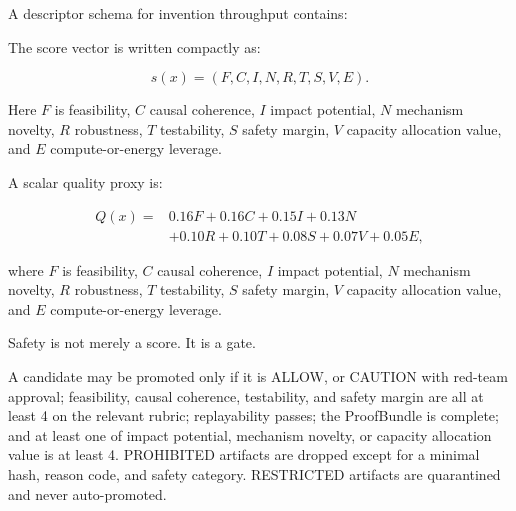 A descriptor schema for invention throughput contains:

\begin{Shaded}
\begin{Highlighting}[]
\end{Highlighting}
\end{Shaded}

The score vector is written compactly as:

\[
s(x)=(F,C,I,N,R,T,S,V,E).
\]

Here \(F\) is feasibility, \(C\) causal coherence, \(I\) impact
potential, \(N\) mechanism novelty, \(R\) robustness, \(T\) testability,
\(S\) safety margin, \(V\) capacity allocation value, and \(E\)
compute-or-energy leverage.

A scalar quality proxy is:

\[
\begin{aligned}
Q(x)=&
0.16F + 0.16C + 0.15I + 0.13N\\
&+0.10R + 0.10T + 0.08S + 0.07V + 0.05E,
\end{aligned}
\]

where \(F\) is feasibility, \(C\) causal coherence, \(I\) impact
potential, \(N\) mechanism novelty, \(R\) robustness, \(T\) testability,
\(S\) safety margin, \(V\) capacity allocation value, and \(E\)
compute-or-energy leverage.

Safety is not merely a score. It is a gate.

\begin{Shaded}
\begin{Highlighting}[]
\end{Highlighting}
\end{Shaded}

A candidate may be promoted only if it is ALLOW, or CAUTION with
red-team approval; feasibility, causal coherence, testability, and
safety margin are all at least 4 on the relevant rubric; replayability
passes; the ProofBundle is complete; and at least one of impact
potential, mechanism novelty, or capacity allocation value is at least
4. PROHIBITED artifacts are dropped except for a minimal hash, reason
code, and safety category. RESTRICTED artifacts are quarantined and
never auto-promoted.


